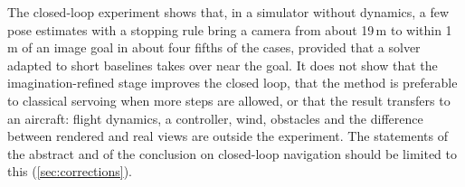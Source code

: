 The closed-loop experiment shows that, in a simulator without dynamics, a few pose estimates with a stopping rule bring a camera from about 19\,m to within 1\,m of an image goal in about four fifths of the cases, provided that a solver adapted to short baselines takes over near the goal. It does not show that the imagination-refined stage improves the closed loop, that the method is preferable to classical servoing when more steps are allowed, or that the result transfers to an aircraft: flight dynamics, a controller, wind, obstacles and the difference between rendered and real views are outside the experiment. The statements of the abstract and of the conclusion on closed-loop navigation should be limited to this (\cref{sec:corrections}).

